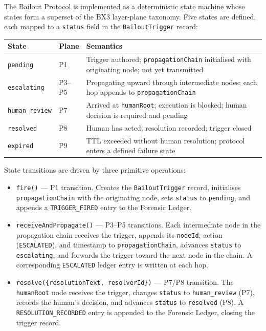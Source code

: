 The Bailout Protocol is implemented as a deterministic state machine whose states
form a superset of the BX3 layer-plane taxonomy.  Five states are defined, each
mapped to a \texttt{status} field in the \texttt{BailoutTrigger} record:

\bigskip
\noindent
\begin{tabular}{llp{7.5cm}}
  \hline
  \textbf{State} & \textbf{Plane} & \textbf{Semantics} \\
  \hline
  \texttt{pending}         & P1 & Trigger authored; \texttt{propagationChain} initialised with
                              originating node; not yet transmitted \\
  \texttt{escalating}    & P3--P5 & Propagating upward through intermediate nodes;
                              each hop appends to \texttt{propagationChain} \\
  \texttt{human\_review} & P7 & Arrived at \texttt{humanRoot}; execution is blocked;
                              human decision is required and pending \\
  \texttt{resolved}      & P8 & Human has acted; resolution recorded; trigger closed \\
  \texttt{expired}       & P9 & TTL exceeded without human resolution; protocol
                              enters a defined failure state \\
  \hline
\end{tabular}
\bigskip

State transitions are driven by three primitive operations:

\begin{itemize}
  \item \texttt{fire()} --- P1 transition.  Creates the \texttt{BailoutTrigger} record,
        initialises \texttt{propagationChain} with the originating node, sets
        \texttt{status} to \texttt{pending}, and appends a \texttt{TRIGGER\_FIRED}
        entry to the Forensic Ledger.

  \item \texttt{receiveAndPropagate()} --- P3--P5 transitions.  Each intermediate node
        in the propagation chain receives the trigger, appends its \texttt{nodeId},
        action (\texttt{ESCALATED}), and timestamp to \texttt{propagationChain},
        advances \texttt{status} to \texttt{escalating}, and forwards the trigger
        toward the next node in the chain.  A corresponding \texttt{ESCALATED}
        ledger entry is written at each hop.

  \item \texttt{resolve(\{resolutionText, resolverId\})} --- P7/P8 transition.
        The \texttt{humanRoot} node receives the trigger, changes \texttt{status}
        to \texttt{human\_review} (P7), records the human's decision, and advances
        \texttt{status} to \texttt{resolved} (P8).  A \texttt{RESOLUTION\_RECORDED}
        entry is appended to the Forensic Ledger, closing the trigger record.
\end{itemize}


